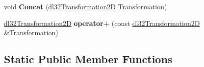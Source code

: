 \begin{DoxyCompactItemize}
\item 
\hypertarget{classdl32_transformation2_d_a19cc4fedac65c0a8a065247b86527730}{void {\bfseries Concat} (\hyperlink{classdl32_transformation2_d}{dl32\-Transformation2\-D} Transformation)}\label{classdl32_transformation2_d_a19cc4fedac65c0a8a065247b86527730}

\item 
\hypertarget{classdl32_transformation2_d_a29539f579176cdc7ea2e4096dc187cca}{\hyperlink{classdl32_transformation2_d}{dl32\-Transformation2\-D} {\bfseries operator+} (const \hyperlink{classdl32_transformation2_d}{dl32\-Transformation2\-D} \&Transformation)}\label{classdl32_transformation2_d_a29539f579176cdc7ea2e4096dc187cca}

\end{DoxyCompactItemize}
\subsection*{Static Public Member Functions}
